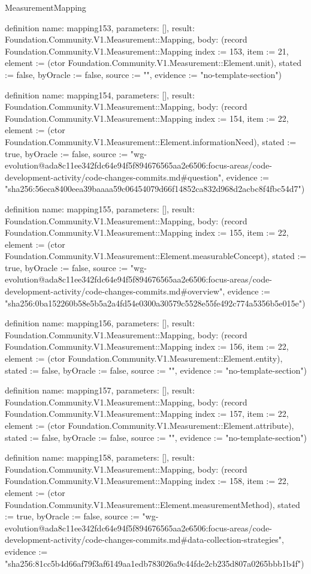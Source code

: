 \begin{lexlean}{MeasurementMapping}
\begin{semanticmodule}
definition{
  name: mapping153,
  parameters: [],
  result: Foundation.Community.V1.Measurement::Mapping,
  body: (record Foundation.Community.V1.Measurement::Mapping {index := 153, item := 21, element := (ctor Foundation.Community.V1.Measurement::Element.unit), stated := false, byOracle := false, source := "", evidence := "no-template-section"})
}

definition{
  name: mapping154,
  parameters: [],
  result: Foundation.Community.V1.Measurement::Mapping,
  body: (record Foundation.Community.V1.Measurement::Mapping {index := 154, item := 22, element := (ctor Foundation.Community.V1.Measurement::Element.informationNeed), stated := true, byOracle := false, source := "wg-evolution@ada8c11ee342fdc64e94f5f894676565aa2e6506:focus-areas/code-development-activity/code-changes-commits.md#question", evidence := "sha256:56eca8400eea39baaaa59c06454079d66f14852ca832d968d2acbc8f4fbc54d7"})
}

definition{
  name: mapping155,
  parameters: [],
  result: Foundation.Community.V1.Measurement::Mapping,
  body: (record Foundation.Community.V1.Measurement::Mapping {index := 155, item := 22, element := (ctor Foundation.Community.V1.Measurement::Element.measurableConcept), stated := true, byOracle := false, source := "wg-evolution@ada8c11ee342fdc64e94f5f894676565aa2e6506:focus-areas/code-development-activity/code-changes-commits.md#overview", evidence := "sha256:0ba152260b58e5b5a2a4fd54e0300a30579c5528e55fe492c774a5356b5e015e"})
}

definition{
  name: mapping156,
  parameters: [],
  result: Foundation.Community.V1.Measurement::Mapping,
  body: (record Foundation.Community.V1.Measurement::Mapping {index := 156, item := 22, element := (ctor Foundation.Community.V1.Measurement::Element.entity), stated := false, byOracle := false, source := "", evidence := "no-template-section"})
}

definition{
  name: mapping157,
  parameters: [],
  result: Foundation.Community.V1.Measurement::Mapping,
  body: (record Foundation.Community.V1.Measurement::Mapping {index := 157, item := 22, element := (ctor Foundation.Community.V1.Measurement::Element.attribute), stated := false, byOracle := false, source := "", evidence := "no-template-section"})
}

definition{
  name: mapping158,
  parameters: [],
  result: Foundation.Community.V1.Measurement::Mapping,
  body: (record Foundation.Community.V1.Measurement::Mapping {index := 158, item := 22, element := (ctor Foundation.Community.V1.Measurement::Element.measurementMethod), stated := true, byOracle := false, source := "wg-evolution@ada8c11ee342fdc64e94f5f894676565aa2e6506:focus-areas/code-development-activity/code-changes-commits.md#data-collection-strategies", evidence := "sha256:81cc5b4d66af79f3af6149aa1edb783026a9c44fde2cb235d807a0265bbb1b4f"})
}


\end{semanticmodule}
\end{lexlean}
